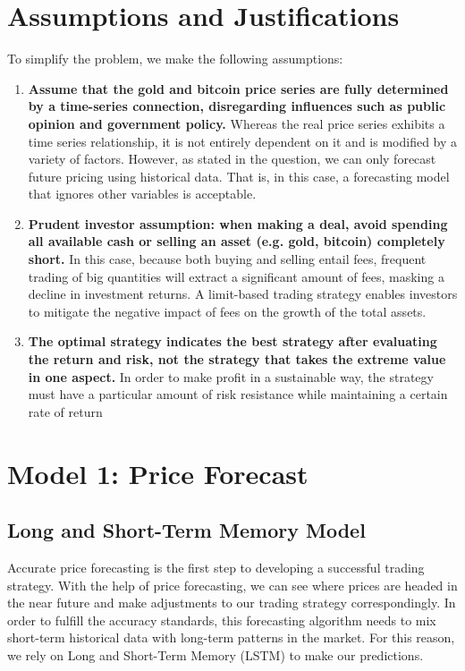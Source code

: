 \documentclass{mcmthesis}
\begin{document}
\section{Assumptions and Justifications} 
To simplify the problem, we make the following assumptions:
\begin{enumerate}
	\item \textbf{Assume that the gold and bitcoin price series are fully determined by a time-series connection, disregarding influences such as public opinion and government policy.}
	Whereas the real price series exhibits a time series relationship, it is not entirely dependent on it and is modified by a variety of factors. However, as stated in the question, we can only forecast future pricing using historical data. That is, in this case, a forecasting model that ignores other variables is acceptable.
	
	\item \textbf{Prudent investor assumption: when making a deal, avoid spending all available cash or selling an asset (e.g. gold, bitcoin) completely short. }In this case, because both buying and selling entail fees, frequent trading of big quantities will extract a significant amount of fees, masking a decline in investment returns. A limit-based trading strategy enables investors to mitigate the negative impact of fees on the growth of the total assets.
	
	\item \textbf{The optimal strategy indicates the best strategy after evaluating the return and risk, not the strategy that takes the extreme value in one aspect.} In order to make profit in a sustainable way, the strategy must have a particular amount of risk resistance while maintaining a certain rate of return
\end{enumerate}
	

\section{Model 1: Price Forecast}
\subsection{Long and Short-Term Memory Model}
Accurate price forecasting is the first step to developing a successful trading strategy. With the help of price forecasting, we can see where prices are headed in the near future and make adjustments to our trading strategy correspondingly. In order to fulfill the accuracy standards, this forecasting algorithm needs to mix short-term historical data with long-term patterns in the market. For this reason, we rely on Long and Short-Term Memory (LSTM) to make our predictions\cite{LSTM}.
\end{document}
